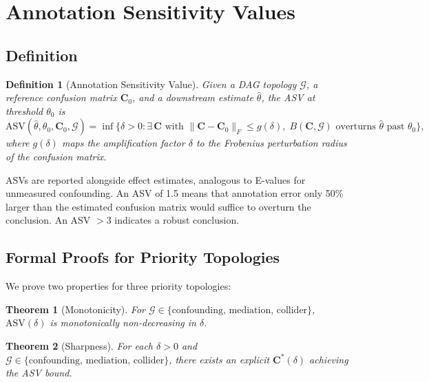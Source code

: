 \documentclass[11pt]{article}
\newtheorem{theorem}{Theorem}
\newtheorem{definition}{Definition}
\newcommand{\bC}{\mathbf{C}}
\begin{document}
\section{Annotation Sensitivity Values}
\label{sec:asv}

\subsection{Definition}

\begin{definition}[Annotation Sensitivity Value]
Given a DAG topology $\mathcal{G}$, a reference confusion matrix $\bC_0$, and a downstream estimate $\hat\theta$, the ASV at threshold $\theta_0$ is
\[
\text{ASV}(\hat\theta, \theta_0, \bC_0, \mathcal{G}) = \inf\!\big\{\delta > 0 : \exists\, \bC \text{ with } \|\bC - \bC_0\|_F \le g(\delta),\; B(\bC, \mathcal{G}) \text{ overturns } \hat\theta \text{ past } \theta_0 \big\},
\]
where $g(\delta)$ maps the amplification factor $\delta$ to the Frobenius perturbation radius of the confusion matrix.
\end{definition}

ASVs are reported alongside effect estimates, analogous to E-values for unmeasured confounding.
An ASV of 1.5 means that annotation error only 50\% larger than the estimated confusion matrix would suffice to overturn the conclusion.
An ASV $>\!3$ indicates a robust conclusion.

\subsection{Formal Proofs for Priority Topologies}

We prove two properties for three priority topologies:

\begin{theorem}[Monotonicity]
For $\mathcal{G} \in \{\text{confounding, mediation, collider}\}$, $\text{ASV}(\delta)$ is monotonically non-decreasing in $\delta$.
\end{theorem}

\begin{theorem}[Sharpness]
For each $\delta > 0$ and $\mathcal{G} \in \{\text{confounding, mediation, collider}\}$, there exists an explicit $\bC^*(\delta)$ achieving the ASV bound.
\end{theorem}
\end{document}
